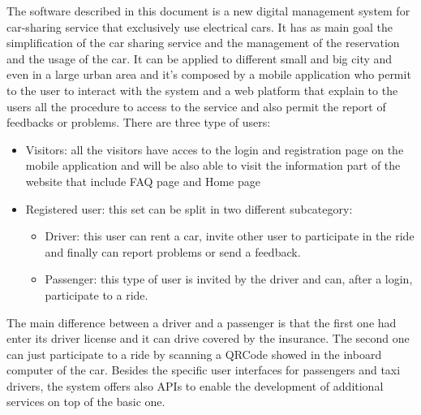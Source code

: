 The software described in this document is a new digital management system for car-sharing service that exclusively use electrical cars. It has as main goal the simplification of the car sharing service and the management of the reservation and the usage of the car. It can be applied to different small and big city and even in a large urban area and it's composed by a mobile application who permit to the user to interact with the system and a web platform that explain to the users all the procedure to access to the service and also permit the report of feedbacks or problems.
There are three type of users:
\begin{itemize}
	\item Visitors: all the visitors have acces to the login and registration page on the mobile application and will be also able to visit the information part of the website that include FAQ page and Home page
	\item Registered user: this set can be split in two different subcategory:
		\begin{itemize}
			\item Driver: this user can rent a car, invite other user to participate in the ride and finally can report problems or send a feedback.
			\item Passenger: this type of user is invited by the driver and can, after a login, participate to a ride. 
		\end{itemize}
\end{itemize}
The main difference between a driver and a passenger is that the first one had enter its driver license and it can drive covered by the insurance. The second one can just participate to a ride by scanning a QRCode showed in the inboard computer of the car.
Besides the specific user interfaces for passengers and taxi drivers, the system offers also APIs to enable the development of additional services on top of the basic one.